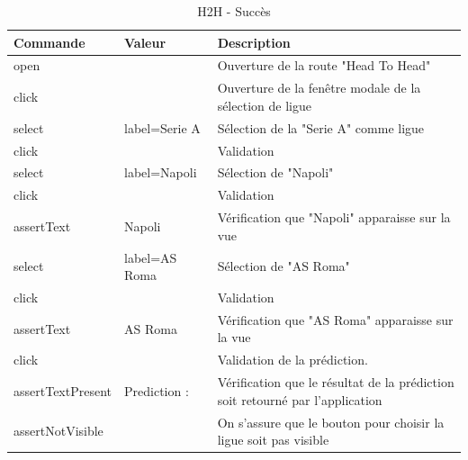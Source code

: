 \documentclass[a4paper,14pt]{extarticle}
\begin{document}
{\begin{table}[htp]
    \centering
    \begin{tabular}{|m{4cm}|m{4cm}|m{6cm}|}
    \hline
    \textbf{Commande} & \textbf{Valeur}                                      & \textbf{Description}                                                                    \\ \hline
    open              &                 & Ouverture de la route "Head To Head"                                          \\ \hline
    click             &                 & Ouverture de la fenêtre modale de la sélection de ligue                       \\ \hline
    select            & label=Serie A   & Sélection de la "Serie A" comme ligue                                         \\ \hline
    click             &                 & Validation                                                                    \\ \hline
    select            & label=Napoli    & Sélection de "Napoli"                                                         \\ \hline
    click             &                 & Validation                                                                    \\ \hline
    assertText        & Napoli          & Vérification que "Napoli" apparaisse sur la vue                               \\ \hline
    select            & label=AS Roma   & Sélection de "AS Roma"                                                        \\ \hline
    click             &                 & Validation                                                                    \\ \hline
    assertText        & AS Roma         & Vérification que "AS Roma" apparaisse sur la vue                              \\ \hline
    click             &                 & Validation de la prédiction.                                                  \\ \hline
    assertTextPresent & Prediction :    & Vérification que le résultat de la prédiction soit retourné par l'application \\ \hline
    assertNotVisible  &                 & On s'assure que le bouton pour choisir la ligue soit pas visible              \\ \hline
    \end{tabular}
    \label{tab:H2HSucces}
    \caption{H2H - Succès}
\end{table}

}
\end{document}
